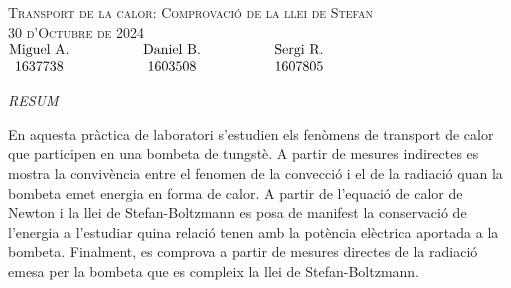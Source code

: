 \documentclass[12pt,twosides,onecolumn,openany]{article}
\begin{document}
\begin{center}
    {\Large \textsc{Transport de la calor: Comprovació de la llei de Stefan}}\\
    \vspace{0.2cm}
    \textsc{30 d'Octubre de 2024}\\
    \vspace{0.2cm}
    $\begin{matrix} 
    \text{Miguel A.} \hspace{1.5cm} & \text{Daniel B.} & \hspace{1.5cm} \text{Sergi R.}\\1637738 \hspace{1.5cm} & 1603508 & \hspace{1.5cm} 1607805
    \end{matrix}$
\end{center}
\begin{center}
    \textsc{\textit{RESUM}}
\end{center}
En aquesta pràctica de laboratori s'estudien els fenòmens de transport de calor que participen en una bombeta de tungstè. A partir de mesures indirectes es mostra la convivència entre el fenomen de la convecció i el de la radiació quan la bombeta emet energia en forma de calor. A partir de l'equació de calor de Newton i la llei de Stefan-Boltzmann es posa de manifest la conservació de l'energia a l'estudiar quina relació tenen amb la potència elèctrica aportada a la bombeta. Finalment, es comprova a partir de mesures directes de la radiació emesa per la bombeta que es compleix la llei de Stefan-Boltzmann.
\vspace{0.5cm}
\end{document}
